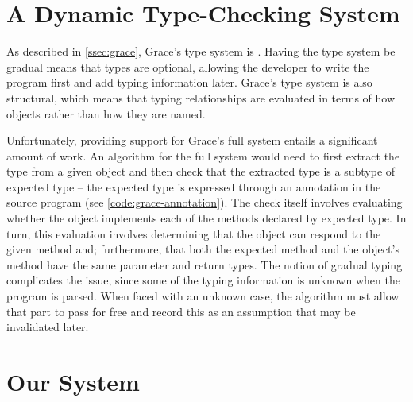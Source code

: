 \section{A Dynamic Type-Checking System}
\label{sec:method}


As described in \cref{ssec:grace},
Grace's type system is . 
Having the type system be gradual means that types are optional,
allowing the developer to write the program first and add typing information later. 
Grace's type system is also structural, 
which means that typing relationships are evaluated
in terms of how objects  rather than how they are named.

Unfortunately, providing support for Grace's full system entails a significant amount of work.
An algorithm for the full system would need to 
first extract the type from a given object 
and then check that the extracted type is a subtype of expected type 
-- the expected type is expressed through an  annotation in the source program
(see \cref{code:grace-annotation}).
The check itself involves evaluating
whether the object implements each of the methods declared by expected type.
In turn, this evaluation involves determining that the object can respond to the given method and;
furthermore, that both the expected method and the object's method have the same parameter and return types.
The notion of gradual typing complicates the issue,
since some of the typing information is unknown when the program is parsed. 
When faced with an unknown case,
the algorithm must allow that part to pass for free
and record this as an assumption that may be invalidated later.


\section{Our System}


